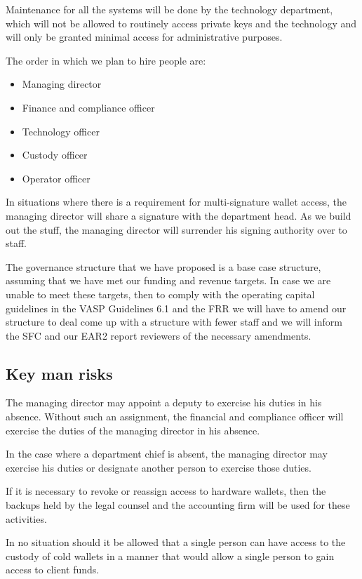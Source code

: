 Maintenance for all the systems will be done by the technology
department, which will not be allowed to routinely access private keys
and the technology and will only be granted minimal access for
administrative purposes.

The order in which we plan to hire people are:

\begin{itemize}
\item Managing director
\item Finance and compliance officer
\item Technology officer 
\item Custody officer
\item Operator officer
\end{itemize}

In situations where there is a requirement for multi-signature wallet
access, the managing director will share a signature with the
department head.  As we build out the stuff, the managing director
will surrender his signing authority over to staff.

The governance structure that we have proposed is a base case
structure, assuming that we have met our funding and revenue targets.
In case we are unable to meet these targets, then to comply with the
operating capital guidelines in the VASP Guidelines 6.1 and the FRR we
will have to amend our structure to deal come up with a structure with
fewer staff and we will inform the SFC and our EAR2 report reviewers
of the necessary amendments.

\subsection{Key man risks}
The managing director may appoint a deputy to exercise his duties in
his absence.  Without such an assignment, the financial and
compliance officer will exercise the duties of the managing director
in his absence.

In the case where a department chief is absent, the managing director
may exercise his duties or designate another person to exercise those
duties.

If it is necessary to revoke or reassign access to hardware wallets,
then the backups held by the legal counsel and the accounting firm
will be used for these activities.

In no situation should it be allowed that a single person can
have access to the custody of cold wallets in a manner that would allow a
single person to gain access to client funds.

